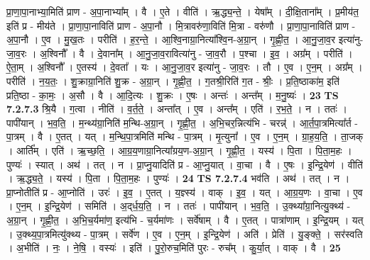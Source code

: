 \documentclass[17pt]{extarticle}
\begin{document}
                  प्रा॒णा॒पा॒नाभ्या॒मिति॑ प्राण - अ॒पा॒नाभ्या᳚म् । वै । ए॒ते । वीति॑ । ऋ॒द्ध्य॒न्ते॒ । येषा᳚म् । दी॒क्षि॒ताना᳚म् । प्र॒मीय॑त॒ इति॑ प्र - मीय॑ते । प्रा॒णा॒पा॒नाविति॑ प्राण - अ॒पा॒नौ । मि॒त्रावरु॑णा॒विति॑ मि॒त्रा - वरु॑णौ । प्रा॒णा॒पा॒नाविति॑ प्राण - अ॒पा॒नौ । ए॒व । मु॒ख॒तः । परीति॑ । ह॒र॒न्ते॒ । आ॒श्वि॒नाग्रा॒नित्या᳚श्वि॒न-अ॒ग्रा॒न् । गृ॒ह्णी॒त॒ । आ॒नु॒जा॒व॒र इत्या॑नु-जा॒व॒रः । अ॒श्विनौ᳚ । वै । दे॒वाना᳚म् । आ॒नु॒जा॒व॒रावित्या॑नु - जा॒व॒रौ । प॒श्चा । इ॒व॒ । अग्र᳚म् । परीति॑ । ऐ॒ता॒म् । अ॒श्विनौ᳚ । ए॒तस्य॑ । दे॒वता᳚ । यः । आ॒नु॒जा॒व॒र इत्या॑नु - जा॒व॒रः । तौ । ए॒व । ए॒न॒म् । अग्र᳚म् । परीति॑ । न॒य॒तः॒ । शु॒क्राग्रा॒निति॑ शु॒क्र - अ॒ग्रा॒न् । गृ॒ह्णी॒त॒ । ग॒तश्री॒रिति॑ ग॒त - श्रीः॒ । प्र॒ति॒ष्ठाका॑म॒ इति॑ प्रति॒ष्ठा - का॒मः॒ । अ॒सौ । वै । आ॒दि॒त्यः । शु॒क्रः । ए॒षः । अन्तः॑ । अन्त᳚म् । म॒नु॒ष्यः॑ । \textbf{  23} \newline
                  \newline
                                \textbf{ TS 7.2.7.3} \newline
                  श्रि॒यै । ग॒त्वा । नीति॑ । व॒र्त॒ते॒ । अन्ता᳚त् । ए॒व । अन्त᳚म् । एति॑ । र॒भ॒ते॒ । न । ततः॑ । पापी॑यान् । भ॒व॒ति॒ । म॒न्थ्य॑ग्रा॒निति॑ म॒न्थि-अ॒ग्रा॒न् । गृ॒ह्णी॒त॒ । अ॒भि॒चर॒न्नित्य॑भि - चरन्न्॑ । आ॒र्त॒पा॒त्रमित्या᳚र्त - पा॒त्रम् । वै । ए॒तत् । यत् । म॒न्थि॒पा॒त्रमिति॑ मन्थि - पा॒त्रम् । मृ॒त्युना᳚ । ए॒व । ए॒न॒म् । ग्रा॒ह॒य॒ति॒ । ता॒जक् । आर्ति᳚म् । एति॑ । ऋ॒च्छ॒ति॒ । आ॒ग्र॒य॒णाग्रा॒नित्या᳚ग्रय॒ण-अ॒ग्रा॒न् । गृ॒ह्णी॒त॒ । यस्य॑ । पि॒ता । पि॒ता॒म॒हः । पुण्यः॑ । स्यात् । अथ॑ । तत् । न । प्रा॒प्नु॒यादिति॑ प्र - आ॒प्नु॒यात् । वा॒चा । वै । ए॒षः । इ॒न्द्रि॒येण॑ । वीति॑ । ऋ॒द्ध्य॒ते॒ । यस्य॑ । पि॒ता । पि॒ता॒म॒हः । पुण्यः॑ । \textbf{  24} \newline
                  \newline
                                \textbf{ TS 7.2.7.4} \newline
                  भव॑ति । अथ॑ । तत् । न । प्रा॒प्नोतीति॑ प्र - आ॒प्नोति॑ । उरः॑ । इ॒व॒ । ए॒तत् । य॒ज्ञ्स्य॑ । वाक् । इ॒व॒ । यत् । आ॒ग्र॒य॒णः । वा॒चा । ए॒व । ए॒न॒म् । इ॒न्द्रि॒येण॑ । समिति॑ । अ॒द्‌र्ध॒य॒ति॒ । न । ततः॑ । पापी॑यान् । भ॒व॒ति॒ । उ॒क्थ्या᳚ग्रा॒नित्यु॒क्थ्य॑ - अ॒ग्रा॒न् । गृ॒ह्णी॒त॒ । अ॒भि॒च॒र्यमा॑ण॒ इत्य॑भि - च॒र्यमा॑णः । सर्वे॑षाम् । वै । ए॒तत् । पात्रा॑णाम् । इ॒न्द्रि॒यम् । यत् । उ॒क्थ्य॒पा॒त्रमित्यु॑क्थ्य - पा॒त्रम् । सर्वे॑ण । ए॒व । ए॒न॒म् । इ॒न्द्रि॒येण॑ । अति॑ । प्रेति॑ । यु॒ङ्क्ते॒ । सर॑स्वति । अ॒भीति॑ । नः॒ । ने॒षि॒ । वस्यः॑ । इति॑ । पु॒रो॒रुच॒मिति॑ पुरः - रुच᳚म् । कु॒र्या॒त् । वाक् । वै । \textbf{  25} \newline
\end{document}
